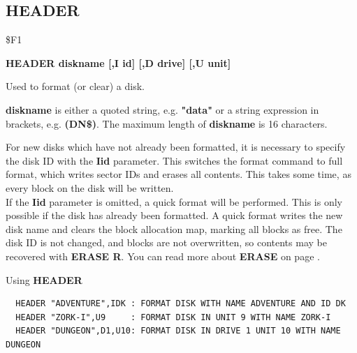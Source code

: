 \subsection{HEADER}
\begin{description}[leftmargin=2cm,style=nextline]
\item [Token:] \$F1
\item [Format:] {\bf HEADER diskname [,I id] [,D drive] [,U unit] }
\item [Usage:]
   Used to format (or clear) a disk.

   {\bf diskname} is either a quoted string, e.g. {\bf "data"} or
   a string expression in brackets, e.g. {\bf (DN\$)}.
   The maximum length of {\bf diskname} is 16 characters.

   \drivedefinition

   \unitdefinition

\item [Remarks:]
   For new disks which have not already been formatted,
   it is necessary to specify the disk ID with the
   {\bf Iid} parameter. This switches the format command to
   full format, which writes sector IDs and erases all contents.
   This takes some time, as every block on the disk will
   be written. \\
   If the {\bf Iid} parameter is omitted, a quick format will
   be performed. This is only possible if the disk has already been formatted.
   A quick format writes the new disk name and clears the
   block allocation map, marking all blocks as free.
   The disk ID is not changed, and blocks are not overwritten,
   so contents may be recovered with {\bf ERASE R}.
   You can read more about {\bf ERASE} on page \pageref{erasecommand}.

\item [Examples:] Using {\bf HEADER}
\begin{tcolorbox}[colback=black,coltext=white]
\verbatimfont{\codefont}
\begin{verbatim}
  HEADER "ADVENTURE",IDK : FORMAT DISK WITH NAME ADVENTURE AND ID DK
  HEADER "ZORK-I",U9     : FORMAT DISK IN UNIT 9 WITH NAME ZORK-I
  HEADER "DUNGEON",D1,U10: FORMAT DISK IN DRIVE 1 UNIT 10 WITH NAME DUNGEON
\end{verbatim}
\end{tcolorbox}
\end{description}


\newpage
